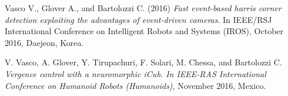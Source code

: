 Vasco V., Glover A., and Bartolozzi C. (2016) {\itshape Fast event-\/based harris corner detection exploiting the advantages of event-\/driven cameras}. In I\+E\+E\+E/\+R\+SJ International Conference on Intelligent Robots and Systems (I\+R\+OS), October 2016, Daejeon, Korea.

V. Vasco, A. Glover, Y. Tirupachuri, F. Solari, M. Chessa, and Bartolozzi C. {\itshape Vergence control with a neuromorphic i\+Cub. In I\+E\+E\+E-\/\+R\+AS International Conference on Humanoid Robots (Humanoids)}, November 2016, Mexico. 
